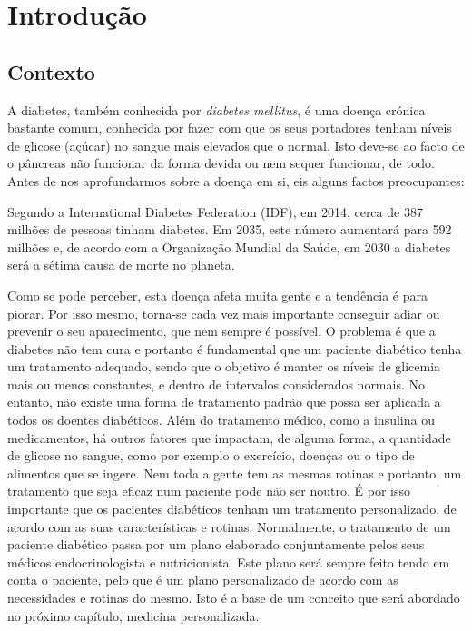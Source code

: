\chapter{Introdução}\label{chap:intro}

\section{Contexto}

A diabetes, também conhecida por \textit{diabetes mellitus}, é uma doença crónica bastante comum, conhecida por fazer com que os seus portadores tenham níveis de glicose (açúcar) no sangue mais elevados que o normal. Isto deve-se ao facto de o pâncreas não funcionar da forma devida ou nem sequer funcionar, de todo. Antes de nos aprofundarmos sobre a doença em si, eis alguns factos preocupantes:

Segundo a International Diabetes Federation (IDF), em 2014, cerca de 387 milhões de pessoas tinham diabetes. Em 2035, este número aumentará para 592 milhões e, de acordo com a Organização Mundial da Saúde, em 2030 a diabetes será a sétima causa de morte no planeta. 

Como se pode perceber, esta doença afeta muita gente e a tendência é para piorar. Por isso mesmo, torna-se cada vez mais importante conseguir adiar ou prevenir o seu aparecimento, que nem sempre é possível. O problema é que a diabetes não tem cura e portanto é fundamental que um paciente diabético tenha um tratamento adequado, sendo que o objetivo é manter os níveis de glicemia mais ou menos constantes, e dentro de intervalos considerados normais. 
No entanto, não existe uma forma de tratamento padrão que possa ser aplicada a todos os doentes diabéticos. Além do tratamento médico, como a insulina ou medicamentos, há outros fatores que impactam, de alguma forma, a quantidade de glicose no sangue, como por exemplo o exercício, doenças ou o tipo de alimentos que se ingere. 
Nem toda a gente tem as mesmas rotinas e portanto, um tratamento que seja eficaz num paciente pode não ser noutro. É por isso importante que os pacientes diabéticos tenham um tratamento personalizado, de acordo com as suas características e rotinas. Normalmente, o tratamento de um paciente diabético passa por um plano elaborado conjuntamente pelos seus médicos endocrinologista e nutricionista. Este plano será sempre feito tendo em conta o paciente, pelo que é um plano personalizado de acordo com as necessidades e rotinas do mesmo. Isto é a base de um conceito que será abordado no próximo capítulo, medicina personalizada.

